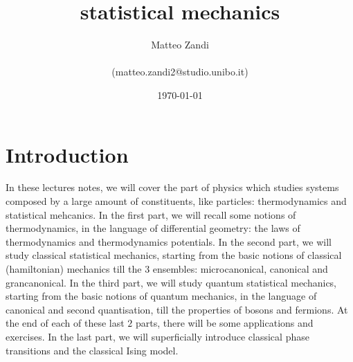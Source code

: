 \documentclass[a4paper, 12pt, openany]{memoir}
\title{statistical mechanics}
\author{Matteo Zandi \\ ~ \\ (matteo.zandi2@studio.unibo.it)}
\date{\today}
\begin{document}
\frontmatter



\tableofcontents

\mainmatter



\chapter*{Introduction}

    In these lectures notes, we will cover the part of physics which studies systems composed by a large amount of constituents, like particles: thermodynamics and statistical mehcanics. In the first part, we will recall some notions of thermodynamics, in the language of differential geometry: the laws of thermodynamics and thermodynamics potentials. In the second part, we will study classical statistical mechanics, starting from the basic notions of classical (hamiltonian) mechanics till the $3$ ensembles: microcanonical, canonical and grancanonical. In the third part, we will study quantum statistical mechanics, starting from the basic notions of quantum mechanics, in the language of canonical and second quantisation, till the properties of bosons and fermions. At the end of each of these last $2$ parts, there will be some applications and exercises. In the last part, we will superficially introduce classical phase transitions and the classical Ising model. 










\backmatter

\nocite{smlecture}
\nocite{ercolessi}

\clearpage
{}
\printbibliography
\end{document}
